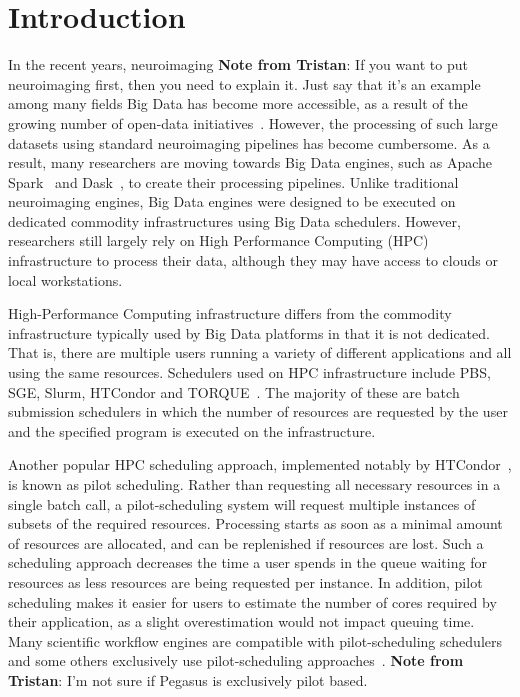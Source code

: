 \documentclass{IEEEtran}
\newcommand{\tristan}[1]{\color{red}\textbf{Note from Tristan}:
      #1 \color{black}}
\newcommand{\TG}[1]{\tristan{#1}}
\newcommand{\todo}[1]{\marginpar{\parbox{18mm}{\flushleft\tiny\color{red}\textbf{TODO}:
      #1}}}
\begin{document}
\section{Introduction}

In the recent years, neuroimaging \TG{If you want to put neuroimaging first, then you need to explain it. Just say that it's an example among many fields}
Big Data has become more accessible, as a
result of the growing number of open-data initiatives~\cite{openneuro, hcp, ukbiobank}. However, the
processing of such large datasets using standard neuroimaging pipelines has 
become cumbersome. As a result, many researchers are moving towards Big Data 
engines, such as Apache Spark~\cite{spark} and Dask~\cite{sdask}, to 
create their processing pipelines. Unlike traditional neuroimaging 
engines, Big Data engines were designed to be executed on dedicated 
commodity infrastructures using Big Data schedulers. However, 
researchers still largely rely on High Performance Computing (HPC) 
infrastructure to process their data, although they may have access to 
clouds or local workstations.

High-Performance Computing infrastructure differs from the commodity infrastructure 
typically used by Big Data platforms in that it is not dedicated. That is, there 
are multiple users running a variety of different applications and all using the 
same resources. Schedulers used on HPC infrastructure include PBS, SGE, Slurm, HTCondor and 
TORQUE~\cite{schedulers}. The majority of these are batch submission schedulers
in which the number of resources are requested by the user and the specified 
program is executed on the infrastructure.

Another popular HPC scheduling approach,
implemented notably by HTCondor~\cite{htcondor}, is known as pilot scheduling. Rather than requesting
all necessary resources in a single batch call, a pilot-scheduling system will request
multiple instances of subsets of the required resources. Processing starts 
as soon as a minimal amount of resources are allocated, and can be replenished if 
resources are lost. Such a scheduling approach decreases the time a 
user spends in the queue waiting for resources as less resources are 
being requested per instance.\todo{need citation} In addition, pilot 
scheduling makes it easier for users to estimate the number of 
cores required by their application, as a slight overestimation would not impact queuing 
time. Many scientific workflow engines are compatible with 
pilot-scheduling schedulers~\cite{nipype and others} and some others 
exclusively use pilot-scheduling approaches~\cite{Pegasus and PSOM}. 
\tristan{I'm not sure if Pegasus is exclusively pilot based.}
\end{document}
